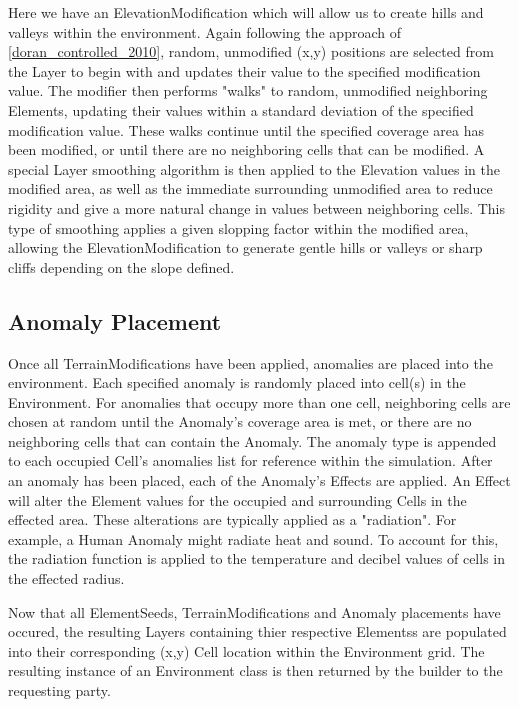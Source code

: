 Here we have an ElevationModification which will allow us to create hills and valleys within the environment.
Again following the approach of \ref{doran_controlled_2010}, random, unmodified (x,y) positions are selected from the Layer to begin with and updates their value to the specified modification value.
The modifier then performs "walks" to random, unmodified neighboring Elements, updating their values within a standard deviation of the specified modification value.
These walks continue until the specified coverage area has been modified, or until there are no neighboring cells that can be modified.
A special Layer smoothing algorithm is then applied to the Elevation values in the modified area, as well as the immediate surrounding unmodified area to reduce rigidity and give a more natural change in values between neighboring cells.
This type of smoothing applies a given slopping factor within the modified area, allowing the ElevationModification to generate gentle hills or valleys or sharp cliffs depending on the slope defined.


\subsection{Anomaly Placement}
Once all TerrainModifications have been applied, anomalies are placed into the environment.
Each specified anomaly is randomly placed into cell(s) in the Environment.
For anomalies that occupy more than one cell, neighboring cells are chosen at random until the Anomaly's coverage area is met, or there are no neighboring cells that can contain the Anomaly.
The anomaly type is appended to each occupied Cell's anomalies list for reference within the simulation.
After an anomaly has been placed, each of the Anomaly's Effects are applied.
An Effect will alter the Element values for the occupied and surrounding Cells in the effected area.
These alterations are typically applied as a "radiation".
For example, a Human Anomaly might radiate heat and sound.
To account for this, the radiation function is applied to the temperature and decibel values of cells in the effected radius.

Now that all ElementSeeds, TerrainModifications and Anomaly placements have occured, the resulting Layers containing thier respective Elementss are populated into their corresponding (x,y) Cell location within the Environment grid.
The resulting instance of an Environment class is then returned by the builder to the requesting party.



